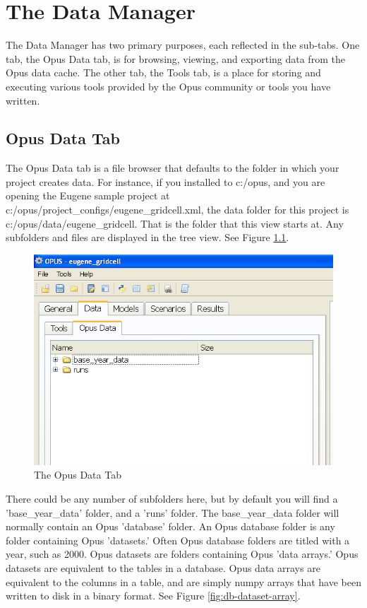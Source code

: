 \chapter{The Data Manager}
The Data Manager has two primary purposes, each reflected in the sub-tabs.  One tab, the Opus Data tab, is for browsing, viewing, and exporting data from the Opus data cache.  The other tab, the Tools tab, is a place for storing and executing various tools provided by the Opus community or tools you have written.

\section{Opus Data Tab}
The Opus Data tab is a file browser that defaults to the folder in which your project creates data.  For instance, if you installed to c:/opus, and you are opening the Eugene sample project at c:/opus/project_configs/eugene_gridcell.xml, the data folder for this project is c:/opus/data/eugene_gridcell.  That is the folder that this view starts at.  Any subfolders and files are displayed in the tree view.  See Figure \ref{fig:opusdatatab}.

\begin{figure}[htp]
\begin{center}
\includegraphics[scale=0.6]{part-gui/images/data-manager-opus-data-tab.png}
\end{center}
\caption{The Opus Data Tab}
\label{fig:opusdatatab}
\end{figure}

There could be any number of subfolders here, but by default you will find a 'base_year_data' folder, and a 'runs' folder.  The base_year_data folder will normally contain an Opus 'database' folder.  An Opus database folder is any folder containing Opus 'datasets.'  Often Opus database folders are titled with a year, such as 2000.  Opus datasets are folders containing Opus 'data arrays.'  Opus datasets are equivalent to the tables in a database.  Opus data arrays are equivalent to the columns in a table, and are simply numpy arrays that have been written to disk in a binary format.  See Figure \ref{fig:db-dataset-array}.

